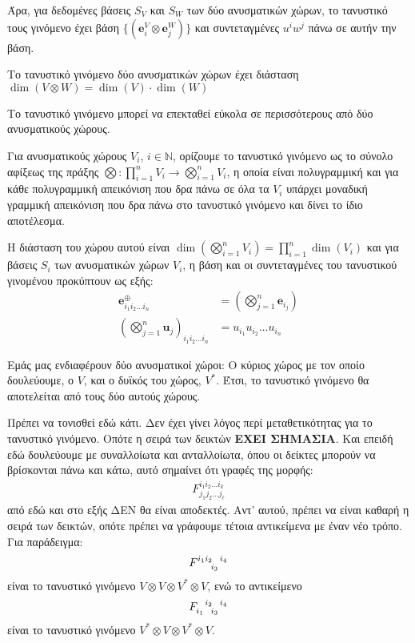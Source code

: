 \documentclass[main.tex]{subfiles}
\begin{document}
 	Άρα, για δεδομένες βάσεις $S_V$ και $S_W$ των δύο ανυσματικών χώρων, το τανυστικό τους γινόμενο έχει βάση $\{(\boldsymbol{e}^V_i\otimes\boldsymbol{e}^W_j)\}$ και συντεταγμένες $u^iw^j$ πάνω σε αυτήν την βάση.
 
 	\begin{corollary}
 		Το τανυστικό γινόμενο δύο ανυσματικών χώρων έχει διάσταση $\dim(V\otimes W) = \dim(V)\cdot\dim(W)$
 	\end{corollary}
 
 	Το τανυστικό γινόμενο μπορεί να επεκταθεί εύκολα σε περισσότερους από δύο ανυσματικούς χώρους.
 	\begin{definition}
 		Για ανυσματικούς χώρους $V_i$, $i\in\mathbb{N}$, ορίζουμε το τανυστικό γινόμενο ως το σύνολο αφίξεως της πράξης $\bigotimes:\prod_{i=1}^{n}V_i\rightarrow\bigotimes_{i=1}^{n}V_i$, η οποία είναι πολυγραμμική και για κάθε πολυγραμμική απεικόνιση που δρα πάνω σε όλα τα $V_i$ υπάρχει μοναδική γραμμική απεικόνιση που δρα πάνω στο τανυστικό γινόμενο και δίνει το ίδιο αποτέλεσμα.
 		
 		Η διάσταση του χώρου αυτού είναι ${\dim(\bigotimes_{i=1}^{n}V_i) = \prod_{i=1}^{n}\dim(V_i)}$ και για βάσεις $S_i$ των ανυσματικών χώρων $V_i$, η βάση και οι συντεταγμένες του τανυστικού γινομένου προκύπτουν ως εξής:
 		\begin{align*}
 			\boldsymbol{e}^\oplus_{i_1i_2\ldots i_n} &= \left(\bigotimes_{j=1}^{n}\boldsymbol{e}_{i_j}\right) \\
 			\left(\bigotimes_{j=1}^{n}\boldsymbol{u}_j\right)_{i_1i_2\ldots i_n} &= u_{i_1}u_{i_2}\ldots u_{i_n}
 		\end{align*} 
 	\end{definition}
 
 	Εμάς μας ενδιαφέρουν δύο ανυσματικοί χώροι: Ο κύριος χώρος με τον οποίο δουλεύουμε, ο $V$, και ο δυϊκός του χώρος, $V^*$. Έτσι, το τανυστικό γινόμενο θα αποτελείται από τους δύο αυτούς χώρους.
 	
 	Πρέπει να τονισθεί εδώ κάτι. Δεν έχει γίνει λόγος περί μεταθετικότητας για το τανυστικό γινόμενο. Οπότε η σειρά των δεικτών \textbf{EXEI ΣΗΜΑΣΙΑ}. Και επειδή εδώ δουλεύουμε με συναλλοίωτα και ανταλλοίωτα, όπου οι δείκτες μπορούν να βρίσκονται πάνω και κάτω, αυτό σημαίνει ότι γραφές της μορφής:
 	\begin{align*}
 		F^{i_1i_2\ldots i_k}_{j_1j_2\ldots j_\ell}
 	\end{align*}
 	από εδώ και στο εξής ΔΕΝ θα είναι αποδεκτές. Αντ' αυτού, πρέπει να είναι καθαρή η σειρά των δεικτών, οπότε πρέπει να γράφουμε τέτοια αντικείμενα με έναν νέο τρόπο. Για παράδειγμα:
 	\begin{align*}
 		F\indices{^{i_1}^{i_2}_{i_3}^{i_4}}
 	\end{align*}
 	είναι το τανυστικό γινόμενο $V\otimes V\otimes V^*\otimes V$, ενώ το αντικείμενο 
 	\begin{align*}
 		F\indices{_{i_1}^{i_2}_{i_3}^{i_4}}
 	\end{align*}
 	είναι το τανυστικό γινόμενο $V^*\otimes V\otimes V^*\otimes V$.
 	
\end{document}
